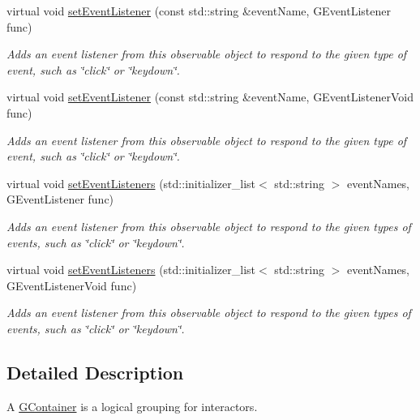 \begin{DoxyCompactItemize}
virtual void \mbox{\hyperlink{classGObservable_ad2f6d34961c50f6c1e0659990b79f741}{set\+Event\+Listener}} (const std\+::string \&event\+Name, G\+Event\+Listener func)
\begin{DoxyCompactList}\small\item\em Adds an event listener from this observable object to respond to the given type of event, such as \char`\"{}click\char`\"{} or \char`\"{}keydown\char`\"{}. \end{DoxyCompactList}\item 
virtual void \mbox{\hyperlink{classGObservable_abac4cb9f9e626e010e87f5d91573c8a5}{set\+Event\+Listener}} (const std\+::string \&event\+Name, G\+Event\+Listener\+Void func)
\begin{DoxyCompactList}\small\item\em Adds an event listener from this observable object to respond to the given type of event, such as \char`\"{}click\char`\"{} or \char`\"{}keydown\char`\"{}. \end{DoxyCompactList}\item 
virtual void \mbox{\hyperlink{classGObservable_afa388d69c33c718cf035774604065604}{set\+Event\+Listeners}} (std\+::initializer\+\_\+list$<$ std\+::string $>$ event\+Names, G\+Event\+Listener func)
\begin{DoxyCompactList}\small\item\em Adds an event listener from this observable object to respond to the given types of events, such as \char`\"{}click\char`\"{} or \char`\"{}keydown\char`\"{}. \end{DoxyCompactList}\item 
virtual void \mbox{\hyperlink{classGObservable_a7867184bbb686f74fae8a4db927da799}{set\+Event\+Listeners}} (std\+::initializer\+\_\+list$<$ std\+::string $>$ event\+Names, G\+Event\+Listener\+Void func)
\begin{DoxyCompactList}\small\item\em Adds an event listener from this observable object to respond to the given types of events, such as \char`\"{}click\char`\"{} or \char`\"{}keydown\char`\"{}. \end{DoxyCompactList}\end{DoxyCompactItemize}


\subsection{Detailed Description}
A \mbox{\hyperlink{classGContainer}{G\+Container}} is a logical grouping for interactors. 

